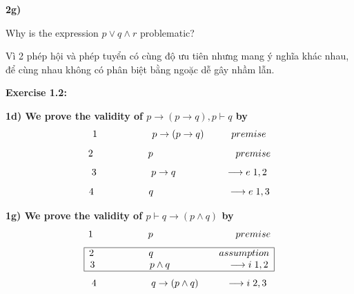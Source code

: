 \documentclass[a4paper]{article}
\begin{document}
\textbf{\large\hspace{1cm} 2g)}{\large\hspace{0.5cm}Why is the expression $p \vee q \wedge r$ problematic?

\hspace{1cm} Vì 2 phép hội và phép tuyển có cùng độ ưu tiên nhưng mang ý nghĩa khác nhau, để cùng nhau không có phân biệt bằng ngoặc dễ gây nhầm lẫn.}

\textbf{\large\hspace{0.5cm} Exercise 1.2:}

\textbf{\large\hspace{1cm} 1d) We prove the validity of	$p \rightarrow (p \rightarrow q), p \vdash q$ by}
{\large
$$1 \hspace{2 cm} p \rightarrow (p \rightarrow q) \hspace{1 cm} premise$$ $$2 \hspace{2 cm}  p  \hspace{3 cm} premise$$ $$3 \hspace{2 cm} p\rightarrow q \hspace{1.8 cm} \longrightarrow e\hspace{0.1 cm} 1,2$$ $$4 \hspace{2 cm} q \hspace{2.7 cm} \longrightarrow e\hspace{0.1 cm} 1,3$$}

\textbf{\large\hspace{1cm} 1g) We prove the validity of	$p \vdash q \rightarrow (p \wedge q)$ by}
{\large $$1 \hspace{2 cm} p \hspace{3 cm} premise$$
$$\begin{array}{|c|} 
\hline
\textcolor{black}{2 \hspace{2 cm} q \hspace{2.4 cm} assumption}\\
\textcolor{black}{3 \hspace{2 cm} p \wedge q \hspace{2.1 cm} \longrightarrow i \hspace{0.1 cm} 1,2}\\
\hline
\end{array}$$
$$4 \hspace{2 cm} q \rightarrow (p \wedge q) \hspace{1 cm} \longrightarrow i\hspace{0.1 cm} 2,3$$}
\end{document}

